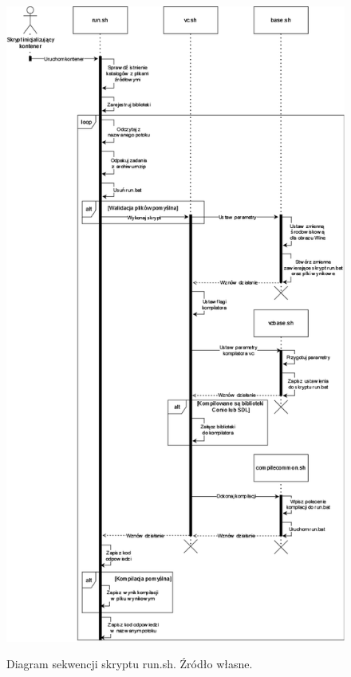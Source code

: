 \begin{figure}[!h]
	\begin{center}
		\resizebox{0.8\textwidth}{!} {
			\includegraphics{img/2/run.png}
		}
		\caption[Diagram sekwencji skryptu run.sh]{Diagram sekwencji skryptu run.sh. Źródło własne.}
	\end{center}
\end{figure}